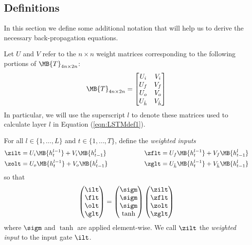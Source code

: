 \subsection{Definitions}
In this section we define some additional notation that will help us to derive the necessary back-propagation equations.

\begin{definition}
Let $U$ and $V$ refer to the $n \times n$ weight matrices corresponding to the following portions of $\MB{T}_{4n \times 2n}$:
\begin{equation}
\MB{T}_{4n \times 2n} = 
\begin{bmatrix}
U_i & V_i \\
U_f  & V_f\\
U_o & V_o\\
U_{\hat{h}} & V_{\hat{h}} \\
\end{bmatrix}
\end{equation}
In particular, we will use the superscript $l$ to denote these matrices used to calculate layer $l$ in Equation (\ref{eqn:LSTMdef1}).
\end{definition}

\begin{definition}
\label{def:z}
For all $l \in \{1,\dots,L\}$ and $t \in \{1,\dots,T\}$, define the \emph{weighted inputs}
\begin{alignat*}{2}
&\zilt = U_i \MB{h_t^{l-1}} + V_i \MB{h_{t-1}^l} \hspace{50pt}
&\zflt = U_f \MB{h_t^{l-1}} + V_f \MB{h_{t-1}^l}\\
&\zolt = U_o \MB{h_t^{l-1}} + V_o \MB{h_{t-1}^l} 
&\zglt = U_{\hat{h}} \MB{h_t^{l-1}} + V_{\hat{h}} \MB{h_{t-1}^l}
\end{alignat*}
so that 
\begin{equation}
\begin{pmatrix}
\ilt \\
\flt \\
\olt \\
\glt
\end{pmatrix}
=
\begin{pmatrix}
\sigm \\
\sigm \\
\sigm \\
\tanh
\end{pmatrix}
\begin{pmatrix}
\zilt \\
\zflt \\
\zolt \\
\zglt
\end{pmatrix}
\end{equation}
where $\sigm$ and $\tanh$ are applied element-wise.
We call $\zilt$ the \emph{weighted input} to the input gate $\ilt$.
\end{definition}

